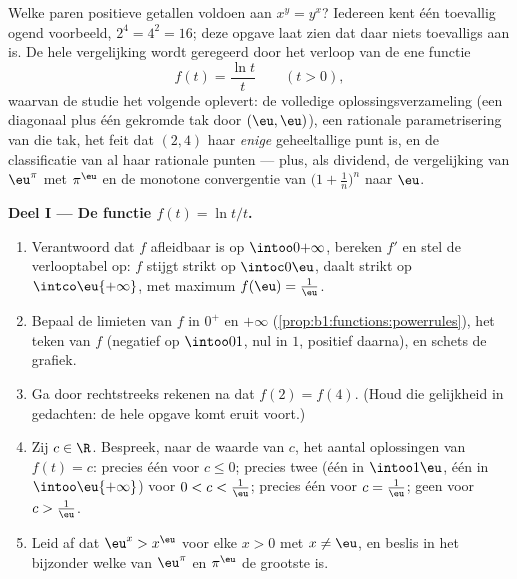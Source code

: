 \begin{problem}\label{pb:b1:functions:1}
Welke paren positieve getallen voldoen aan $x^y = y^x$? Iedereen kent
één toevallig ogend voorbeeld, $2^4 = 4^2 = 16$; deze opgave laat zien
dat daar niets toevalligs aan is. De hele vergelijking wordt geregeerd
door het verloop van de ene functie
\[
f(t) = \frac{\ln t}{t} \qquad (t > 0),
\]
waarvan de studie het volgende oplevert: de volledige
oplossingsverzameling (een diagonaal plus één gekromde tak door $(\eu,
\eu)$), een rationale parametrisering van die tak, het feit dat $(2, 4)$
haar \emph{enige} geheeltallige punt is, en de classificatie van al haar
rationale punten --- plus, als dividend, de vergelijking van $\eu^\pi$
met $\pi^\eu$ en de monotone convergentie van $\bigl(1 +
\frac1n\bigr)^n$ naar $\eu$.

\medskip
\noindent\textbf{Deel I --- De functie $f(t) = \ln t / t$.}
\begin{enumerate}
  \item Verantwoord dat $f$ afleidbaar is op $\intoo0{+\infty}$,
        bereken $f'$ en stel de verlooptabel op: $f$ stijgt strikt op
        $\intoc0\eu$, daalt strikt op $\intco\eu{+\infty}$, met maximum
        $f(\eu) = \frac1\eu$.
  \item Bepaal de limieten van $f$ in $0^+$ en $+\infty$
        (\cref{prop:b1:functions:powerrules}), het teken van $f$
        (negatief op $\intoo01$, nul in $1$, positief daarna), en
        schets de grafiek.
  \item Ga door rechtstreeks rekenen na dat $f(2) = f(4)$. (Houd die
        gelijkheid in gedachten: de hele opgave komt eruit voort.)
  \item Zij $c \in \R$. Bespreek, naar de waarde van $c$, het aantal
        oplossingen van $f(t) = c$: precies één voor $c \leq 0$;
        precies twee (één in $\intoo1\eu$, één in
        $\intoo\eu{+\infty}$) voor $0 < c < \frac1\eu$; precies één
        voor $c = \frac1\eu$; geen voor $c > \frac1\eu$.
  \item Leid af dat $\eu^x > x^\eu$ voor elke $x > 0$ met $x \neq \eu$,
        en beslis in het bijzonder welke van $\eu^\pi$ en $\pi^\eu$ de
        grootste is.
\end{enumerate}


\end{problem}
